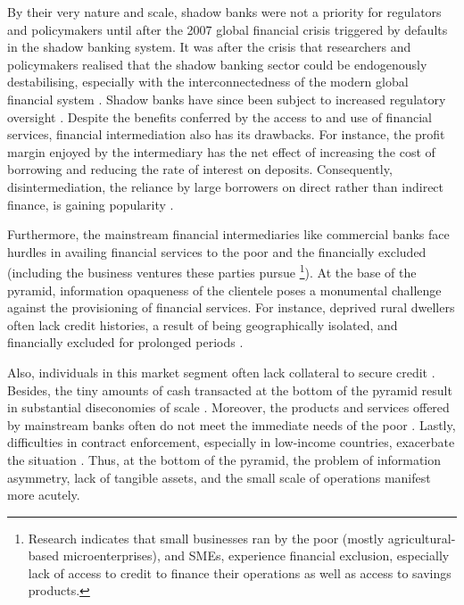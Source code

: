 \documentclass[a4paper, nobind]{templates/ociamthesis}
\begin{document}
By their very nature and scale, shadow banks were not a priority for regulators and policymakers until after the 2007 global financial crisis triggered by defaults in the shadow banking system. It was after the crisis that researchers and policymakers realised that the shadow banking sector could be endogenously destabilising, especially with the interconnectedness of the modern global financial system \autocite{board2017assessment}. Shadow banks have since been subject to increased regulatory oversight \autocite{fenton2017role}. Despite the benefits conferred by the access to and use of financial services, financial intermediation also has its drawbacks. For instance, the profit margin enjoyed by the intermediary has the net effect of increasing the cost of borrowing and reducing the rate of interest on deposits. Consequently, disintermediation, the reliance by large borrowers on direct rather than indirect finance, is gaining popularity \autocite{greenbaum2019contemporary}.

Furthermore, the mainstream financial intermediaries like commercial banks face hurdles in availing financial services to the poor and the financially excluded (including the business ventures these parties pursue \footnote{Research indicates that small businesses ran by the poor (mostly agricultural-based microenterprises), and SMEs, experience financial exclusion, especially lack of access to credit to finance their operations as well as access to savings products.}). At the base of the pyramid, information opaqueness of the clientele poses a monumental challenge against the provisioning of financial services. For instance, deprived rural dwellers often lack credit histories, a result of being geographically isolated, and financially excluded for prolonged periods \autocite{alimukhamedova2017importance}.

Also, individuals in this market segment often lack collateral to secure credit \autocite{briere2015does}. Besides, the tiny amounts of cash transacted at the bottom of the pyramid result in substantial diseconomies of scale \autocite{abate2014cost,cobb2016funding}. Moreover, the products and services offered by mainstream banks often do not meet the immediate needs of the poor \autocite{gajjala2016financial}. Lastly, difficulties in contract enforcement, especially in low-income countries, exacerbate the situation \autocite{klapper2015role}. Thus, at the bottom of the pyramid, the problem of information asymmetry, lack of tangible assets, and the small scale of operations manifest more acutely.
\end{document}
